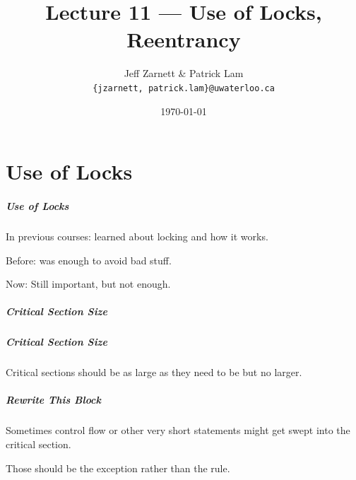 
\usepackage{multirow}

\title{Lecture 11 --- Use of Locks, Reentrancy}

\author{Jeff Zarnett \& Patrick Lam \\ \small \texttt{\{jzarnett, patrick.lam\}@uwaterloo.ca}}
\date{\today}




\begin{frame}
  \titlepage

 \end{frame}


\part{Use of Locks}
\frame{\partpage}


\begin{frame}
\frametitle{Use of Locks}

\vspace*{-3em}
In previous courses: learned about locking and how it works.

Before: was enough to avoid bad stuff.

Now: Still important, but not enough.


\end{frame}


\begin{frame}
\frametitle{Critical Section Size}

  \begin{center}
    
  \end{center}

\end{frame}

\begin{frame}
\frametitle{Critical Section Size}

  \begin{center}
    
  \end{center}

Critical sections should be as large as they need to be but no larger. 

\end{frame}


\begin{frame}
\frametitle{Rewrite This Block}

  \begin{center}
    
  \end{center}

Sometimes control flow or other very short statements might get swept into the critical section.

Those should be the exception rather than the rule.

\end{frame}


